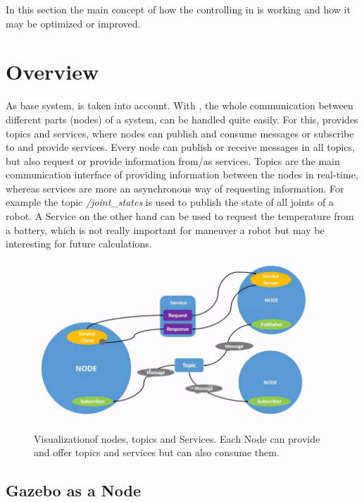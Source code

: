 
In this section the main concept of how the controlling in  is working and how it may be optimized or improved.

\section[Overview]{Overview} \label{sec:concept-overview}

As base system,  is taken into account.
With , the whole communication between different parts (nodes) of a system, can be handled quite easily.
For this,  provides topics and services, where nodes can publish and consume messages or subscribe to and provide services.
Every node can publish or receive messages in all topics, but also request or provide information from/as services.
Topics are the main communication interface of providing information between the nodes in real-time, whereas services are more an asynchronous way of requesting information.
For example the topic \textit{/joint\_states} is used to publish the state of all joints of a robot.
A Service on the other hand can be used to request the temperature from a battery, which is not really important for maneuver a robot but may be interesting for future calculations.

\begin{figure}[H]
    \centering
    \includegraphics[width=0.6\linewidth]{images/NodesTopicandService}
    \caption[ Nodes, Topics and Services]{Visualization\protect\footnotemark of  \Glspl{node}, \Glspl{topic} and Services. Each Node can provide and offer topics and services but can also consume them.}
    \label{fig:ros-nodes-topics-services}
\end{figure}



\subsection[Gazebo]{Gazebo as a Node} \label{sec:gazebo-node}

